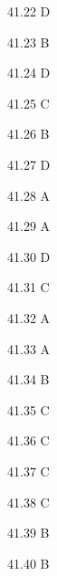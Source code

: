 \begin{Solution}{41.{22}}
D
\end{Solution}
\begin{Solution}{41.{23}}
B
\end{Solution}
\begin{Solution}{41.{24}}
D
\end{Solution}
\begin{Solution}{41.{25}}
C
\end{Solution}
\begin{Solution}{41.{26}}
B
\end{Solution}
\begin{Solution}{41.{27}}
D
\end{Solution}
\begin{Solution}{41.{28}}
A
\end{Solution}
\begin{Solution}{41.{29}}
A
\end{Solution}
\begin{Solution}{41.{30}}
D
\end{Solution}
\begin{Solution}{41.{31}}
C
\end{Solution}
\begin{Solution}{41.{32}}
A
\end{Solution}
\begin{Solution}{41.{33}}
A
\end{Solution}
\begin{Solution}{41.{34}}
B
\end{Solution}
\begin{Solution}{41.{35}}
C
\end{Solution}
\begin{Solution}{41.{36}}
C
\end{Solution}
\begin{Solution}{41.{37}}
C
\end{Solution}
\begin{Solution}{41.{38}}
C
\end{Solution}
\begin{Solution}{41.{39}}
B
\end{Solution}
\begin{Solution}{41.{40}}
B
\end{Solution}
